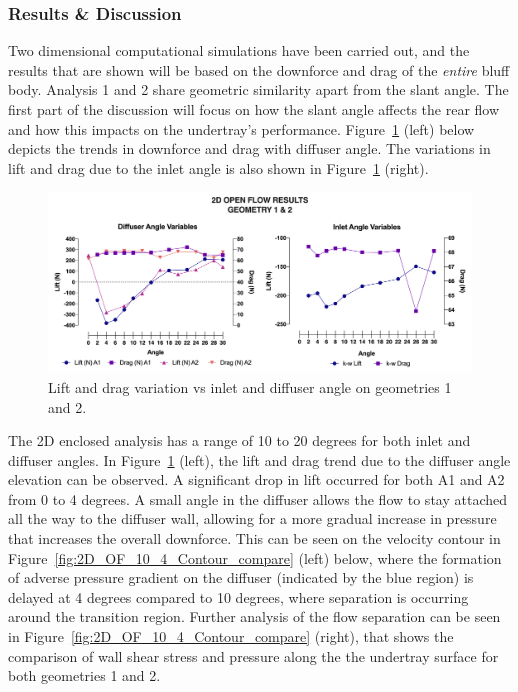 \subsubsection{Results \& Discussion}

\noindent Two dimensional computational simulations have been carried out, and the results that are shown will be based on the downforce and drag of the \textit{entire} bluff body. Analysis 1 and 2 share geometric similarity apart from the slant angle. The first part of the discussion will focus on how the slant angle affects the rear flow and how this impacts on the undertray's performance. Figure~\ref{fig:2D_OF_A12_results} (left) below depicts the trends in downforce and drag with diffuser angle. The variations in lift and drag due to the inlet angle is also shown in Figure~\ref{fig:2D_OF_A12_results} (right).

\begin{figure}[!ht]
    \centering
    \includegraphics[scale = 0.6]{Figures/Graph/2D_OF_A1-2.png}
    \caption{Lift and drag variation vs inlet and diffuser angle on geometries 1 and 2. }
    \label{fig:2D_OF_A12_results}
\end{figure}

\noindent The 2D enclosed analysis has a range of 10 to 20 degrees for both inlet and diffuser angles. In Figure~\ref{fig:2D_OF_A12_results} (left), the lift and drag trend due to the diffuser angle elevation can be observed. A significant drop in lift occurred for both A1 and A2 from 0 to 4 degrees. A small angle in the diffuser allows the flow to stay attached all the way to the diffuser wall, allowing for a more gradual increase in pressure that increases the overall downforce. This can be seen on the velocity contour in Figure~\ref{fig:2D_OF_10_4_Contour_compare} (left) below, where the formation of adverse pressure gradient on the diffuser (indicated by the blue region) is delayed at 4 degrees compared to 10 degrees, where separation is occurring around the transition region. Further analysis of the flow separation can be seen in Figure~\ref{fig:2D_OF_10_4_Contour_compare} (right), that shows the comparison of wall shear stress and pressure along the the undertray surface for both geometries 1 and 2. 

